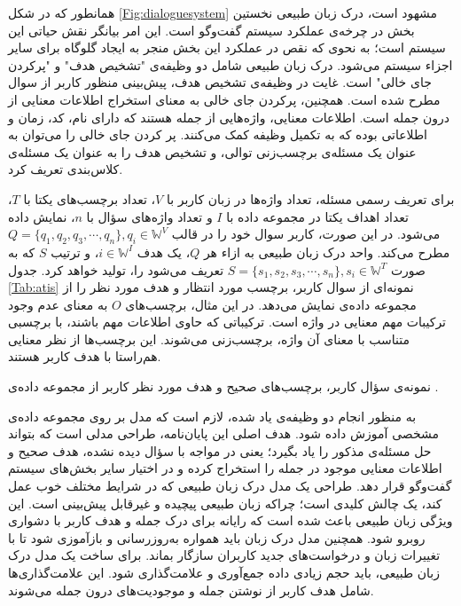همانطور که در شکل \ref{Fig:dialoguesystem} مشهود است، درک زبان طبیعی نخستین بخش در چرخه‌ی عملکرد سیستم گفت‌وگو است. این امر بیانگر نقش حیاتی این سیستم است؛ به نحوی که نقص در عملکرد این بخش منجر به ایجاد گلوگاه برای سایر اجزاء سیستم می‌شود.
 درک زبان طبیعی شامل دو وظیفه‌ی "تشخیص هدف" و "پرکردن جای خالی" است.  غایت در وظیفه‌ی تشخیص هدف، پیش‌بینی منظور کاربر از سوال مطرح شده است. همچنین، پرکردن جای خالی به معنای استخراج اطلاعات معنایی از درون جمله است. اطلاعات معنایی، واژه‌هایی از جمله هستند که دارای نام، کد، زمان و اطلاعاتی بوده که به تکمیل وظیفه کمک می‌کنند. پر کردن جای خالی را می‌توان به عنوان یک مسئله‌ی برچسب‌زنی توالی، و تشخیص هدف را به عنوان یک مسئله‌ی کلاس‌بندی تعریف کرد.
 
 
برای تعریف رسمی مسئله، تعداد واژه‌ها در زبان کاربر با $V$، تعداد برچسب‌های یکتا با $T$، تعداد اهداف یکتا در مجموعه داده با $I$ و تعداد واژه‌های سؤال با $n$، نمایش داده می‌شود. در این صورت، کاربر سوال خود را در قالب $Q=\{q_{1},q_{2},q_{3},\cdots,q_{n}\} , q_{i}\in\mathbb{W}^{V}$ مطرح می‌کند. واحد درک زبان طبیعی به ازاء هر $Q$، یک هدف $i\in\mathbb{W}^{I}$، و ترتیب $S$ که به صورت $S=\{s_{1},s_{2},s_{3},\cdots,s_{n}\} , s_{i}\in\mathbb{W}^{T}$ تعریف می‌شود را، تولید خواهد کرد. جدول \ref{Tab:atis} نمونه‌ای از سوال کاربر، برچسب مورد انتظار و هدف مورد نظر را از مجموعه داده‌ی  نمایش می‌دهد. در این مثال، برچسب‌های $O$ به معنای عدم وجود ترکیبات مهم معنایی در واژه است. ترکیباتی که حاوی اطلاعات مهم باشند، با برچسبی متناسب با معنای آن واژه، برچسب‌زنی می‌شوند. این برچسب‌ها از نظر معنایی هم‌راستا با هدف کاربر هستند. 


\begin{table}[ht]
	\begin{latin}
		
	\end{latin}
	
	\caption{
		نمونه‌ی سؤال کاربر، برچسب‌های صحیح و هدف مورد نظر کاربر از مجموعه داده‌ی .
	}
	\label{Tab:atis}
\end{table}
به منظور انجام دو وظیفه‌ی یاد شده، لازم است که مدل بر روی مجموعه داده‌ی مشخصی آموزش داده شود. 
هدف اصلی این پایان‌نامه، طراحی مدلی است که بتواند حل مسئله‌ی مذکور را یاد بگیرد؛ یعنی در مواجه با سؤال دیده نشده، هدف صحیح و اطلاعات معنایی موجود در جمله را استخراج کرده و در اختیار سایر بخش‌های سیستم گفت‌وگو قرار دهد.
طراحی یک مدل درک زبان طبیعی که در شرایط مختلف خوب عمل کند، یک چالش کلیدی است؛ چراکه زبان طبیعی پیچیده و غیرقابل پیش‌بینی است. این ویژگی زبان طبیعی باعث شده است که رایانه برای درک جمله و هدف کاربر با دشواری روبرو شود. همچنین مدل درک زبان باید همواره به‌روزرسانی و بازآموزی شود تا با تغییرات زبان و درخواست‌های جدید کاربران سازگار بماند. برای ساخت یک مدل درک زبان طبیعی، باید حجم زیادی داده جمع‌آوری و علامت‌گذاری شود. این علامت‌گذاری‌ها شامل هدف کاربر از نوشتن جمله و موجودیت‌های درون جمله می‌شوند.

